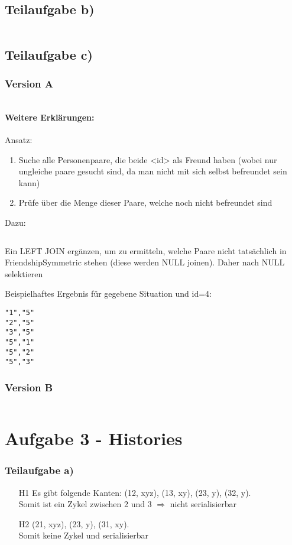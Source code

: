\documentclass[a4paper,9pt]{scrartcl}
\begin{document}
\subsection{Teilaufgabe b)}
\inputminted[linenos, numbersep=5pt, tabsize=4]{sql}{d2b.sql}

\subsection{Teilaufgabe c)}
\subsubsection{Version A}
\inputminted[linenos, numbersep=5pt, tabsize=4]{sql}{d2c1.sql}

\paragraph{Weitere Erklärungen:}
Ansatz:
\begin{enumerate}
    \item Suche alle Personenpaare, die beide <id> als Freund haben (wobei
   nur ungleiche paare gesucht sind, da man nicht mit sich selbst befreundet
   sein kann)
    \item Prüfe über die Menge dieser Paare, welche noch nicht befreundet sind
\end{enumerate}

Dazu:
\inputminted[linenos, numbersep=5pt, tabsize=4]{sql}{d2c1.2.sql}

Ein LEFT JOIN ergänzen, um zu ermitteln, welche Paare nicht tatsächlich
in FriendshipSymmetric stehen (diese werden NULL joinen). Daher nach NULL
selektieren


Beispielhaftes Ergebnis für gegebene Situation und id=4:
\begin{verbatim}
"1","5"
"2","5"
"3","5"
"5","1"
"5","2"
"5","3"
\end{verbatim}
 
\subsubsection{Version B}
\inputminted[linenos, numbersep=5pt, tabsize=4]{sql}{d2c2.sql}

\section{Aufgabe 3 - Histories}
\subsubsection{Teilaufgabe a)}
\begin{itemize}
\item[H1] Es gibt folgende Kanten:
    (12, xyz), (13, xy), (23, y), (32, y).\\
    Somit ist ein Zykel zwischen 2 und 3 $\Rightarrow$ nicht serialisierbar
\item[H2] (21, xyz), (23, y), (31, xy).\\
    Somit keine Zykel und serialisierbar
\end{itemize}
\end{document}
